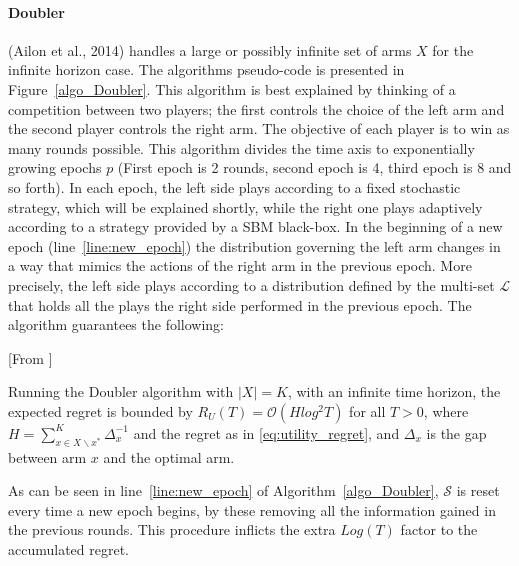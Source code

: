 \documentclass{llncs}
\begin{document}
	\paragraph{Doubler}
	(Ailon et al., 2014) handles a large or possibly infinite set of arms $X$ for the infinite horizon case.
	The algorithms pseudo-code is presented in Figure~\ref{algo_Doubler}.
	This algorithm is best explained by thinking of a competition between two players; the first controls the choice of the left arm and the second player controls the right arm. 
	The objective of each player is to win as many rounds possible.
	This algorithm divides the time axis to exponentially growing epochs  $p$ (First epoch is 2 rounds, second epoch is 4, third epoch is 8 and so forth).
	In each epoch, the left side plays according to a fixed stochastic strategy, which will be explained shortly, while the right one plays adaptively according to a strategy provided by a SBM black-box.
	In the beginning of a new epoch (line~\ref{line:new_epoch}) the distribution governing the left arm changes in a way that mimics the actions of the right arm in the previous epoch.
	More precisely, the left side plays according to a distribution defined by the multi-set $\mathcal{L}$ that holds all the plays the right side performed in the previous epoch.
	The algorithm guarantees the following:
	\begin{theorem}\label{thm:Doubler}[From \cite{...}]

		Running the Doubler algorithm with $|X|=K$, with an infinite time horizon, the expected regret is bounded by $R_U(T) = \mathcal{O} \left(H log^2 T \right)$ for all $T>0$, where $H=\sum_{x\in X \backslash x^*}^K \Delta^{-1}_x$ and the regret as in \eqref{eq:utility_regret}, and $\Delta_x$ is the gap between arm $x$ and the optimal arm.

	\end{theorem}
	As can be seen in line~\ref{line:new_epoch} of Algorithm~\ref{algo_Doubler},  $\mathcal{S}$ is reset every time a new epoch begins, by these removing all the information gained in the previous rounds. This procedure inflicts the extra $Log(T)$ factor to the accumulated regret.
	
\end{document}
